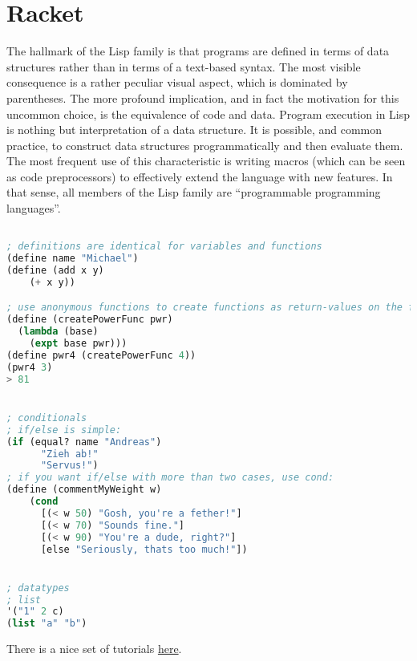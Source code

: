 \section{Racket}

The hallmark of the Lisp family is that programs are defined in terms of data structures rather than in terms of a text-based syntax. The most visible consequence is a rather peculiar visual aspect, which is dominated by parentheses. The more profound implication, and in fact the motivation for this uncommon choice, is the equivalence of code and data. Program execution in Lisp is nothing but interpretation of a data structure. It is possible, and common practice, to construct data structures programmatically and then evaluate them. The most frequent use of this characteristic is writing macros (which can be seen as code preprocessors) to effectively extend the language with new features. In that sense, all members of the Lisp family are “programmable programming languages”. 

\begin{lstlisting}[language=lisp]

; definitions are identical for variables and functions
(define name "Michael")
(define (add x y)
    (+ x y))

; use anonymous functions to create functions as return-values on the fly
(define (createPowerFunc pwr)
  (lambda (base)
    (expt base pwr)))
(define pwr4 (createPowerFunc 4))
(pwr4 3)
> 81


; conditionals
; if/else is simple:
(if (equal? name "Andreas")
      "Zieh ab!"
      "Servus!")
; if you want if/else with more than two cases, use cond:
(define (commentMyWeight w)
    (cond
      [(< w 50) "Gosh, you're a fether!"]
      [(< w 70) "Sounds fine."]
      [(< w 90) "You're a dude, right?"]
      [else "Seriously, thats too much!"])


; datatypes
; list
'("1" 2 c)
(list "a" "b")


\end{lstlisting}

There is a nice set of tutorials \href{https://beautifulracket.com/stacker/}{here}.
